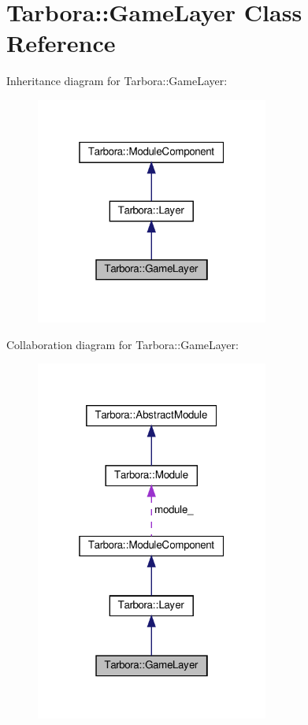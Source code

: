 \hypertarget{classTarbora_1_1GameLayer}{}\section{Tarbora\+:\+:Game\+Layer Class Reference}
\label{classTarbora_1_1GameLayer}


Inheritance diagram for Tarbora\+:\+:Game\+Layer\+:\nopagebreak
\begin{figure}[H]
\begin{center}
\leavevmode
\includegraphics[width=217pt]{classTarbora_1_1GameLayer__inherit__graph}
\end{center}
\end{figure}


Collaboration diagram for Tarbora\+:\+:Game\+Layer\+:\nopagebreak
\begin{figure}[H]
\begin{center}
\leavevmode
\includegraphics[width=217pt]{classTarbora_1_1GameLayer__coll__graph}
\end{center}
\end{figure}

